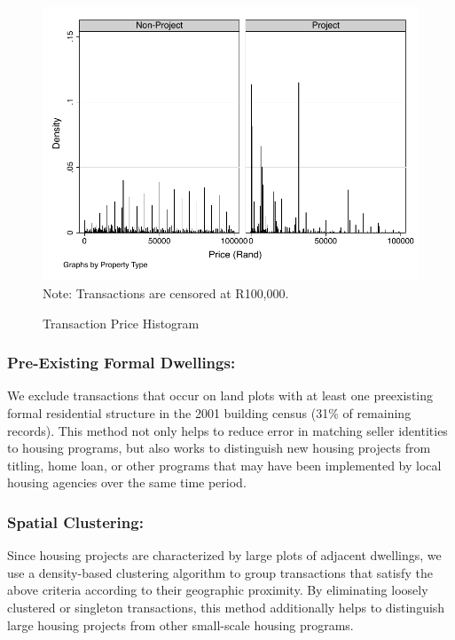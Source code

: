 \documentclass[12pt]{article}
\begin{document}

\begin{figure}
\caption{Transaction Price Histogram}\label{figure:transactionhist}
\centering
\includegraphics[scale=1]{figures/price_histogram.pdf}\\
Note: Transactions are censored at R100,000.
\end{figure}


\subsubsection{Pre-Existing Formal Dwellings:}  


We exclude transactions that occur on land plots with at least one preexisting formal residential structure in the 2001 building census (31\% of remaining records).  This method not only helps to reduce error in matching seller identities to housing programs, but also works to distinguish new housing projects from titling, home loan, or other programs that may have been implemented by local housing agencies over the same time period.   

\subsubsection{Spatial Clustering:}  Since housing projects are characterized by large plots of adjacent dwellings, we use a density-based clustering algorithm to group transactions that satisfy the above criteria according to their geographic proximity.  By eliminating loosely clustered or singleton transactions, this method additionally helps to distinguish large housing projects from other small-scale housing programs.  
\end{document}
